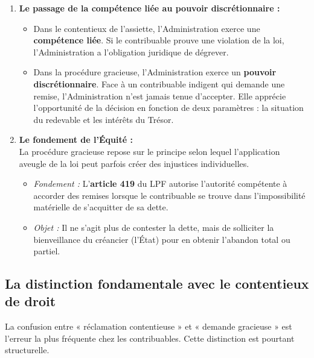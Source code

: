 \documentclass[Cours_contentieuxTF2026.tex]{subfiles}
\begin{document}
	\begin{enumerate}
		\item \textbf{Le passage de la compétence liée au pouvoir discrétionnaire :}
		\begin{itemize}
			\item Dans le contentieux de l'assiette, l'Administration exerce une \textbf{compétence liée}. Si le contribuable prouve une violation de la loi, l'Administration a l'obligation juridique de dégrever.
			\item Dans la procédure gracieuse, l'Administration exerce un \textbf{pouvoir discrétionnaire}. Face à un contribuable indigent qui demande une remise, l'Administration n'est jamais tenue d'accepter. Elle apprécie l'opportunité de la décision en fonction de deux paramètres : la situation du redevable et les intérêts du Trésor.
		\end{itemize}
		
		\item \textbf{Le fondement de l'Équité :} \\
		La procédure gracieuse repose sur le principe selon lequel l'application aveugle de la loi peut parfois créer des injustices individuelles.
		\begin{itemize}
			\item \textit{Fondement :} L'\textbf{article 419} du LPF autorise l'autorité compétente à accorder des remises lorsque le contribuable se trouve dans l'impossibilité matérielle de s'acquitter de sa dette.
			\item \textit{Objet :} Il ne s'agit plus de contester la dette, mais de solliciter la bienveillance du créancier (l'État) pour en obtenir l'abandon total ou partiel.
		\end{itemize}
	\end{enumerate}
	
	\subsection{La distinction fondamentale avec le contentieux de droit}
	
	La confusion entre « réclamation contentieuse » et « demande gracieuse » est l'erreur la plus fréquente chez les contribuables. Cette distinction est pourtant structurelle.
	
\end{document}
